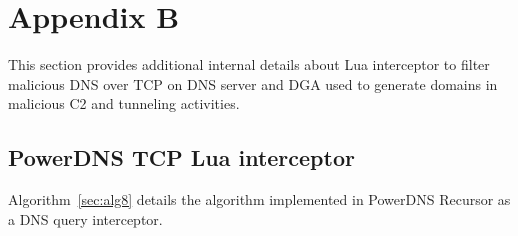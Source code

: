 \documentclass [11pt, proquest] {uwthesis}[2020/02/24]
\begin{document}

\section{Appendix B}
This section provides additional internal details about Lua interceptor to filter malicious DNS over TCP on DNS server and DGA used to generate domains in malicious C2 and tunneling activities.



\subsection{PowerDNS TCP Lua interceptor}
Algorithm~\ref{sec:alg8} details the algorithm implemented in PowerDNS Recursor as a DNS query interceptor.
\end{document}
